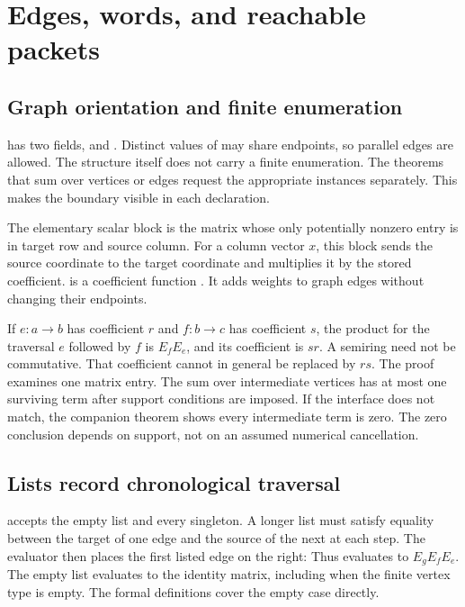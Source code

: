 \clearpage
\section{Edges, words, and reachable packets}
\subsection{Graph orientation and finite enumeration}
 has two fields,  and . Distinct values of  may share endpoints, so parallel edges are allowed. The structure itself does not carry a finite enumeration. The theorems that sum over vertices or edges request the appropriate  instances separately. This makes the boundary visible in each declaration.

The elementary scalar block is the matrix whose only potentially nonzero entry is in target row and source column.
For a column vector $x$, this block sends the source coordinate to the target coordinate and multiplies it by the stored coefficient.  is a coefficient function . It adds weights to graph edges without changing their endpoints.

If $e:a\to b$ has coefficient $r$ and $f:b\to c$ has coefficient $s$, the product for the traversal $e$ followed by $f$ is $E_fE_e$, and its coefficient is $sr$. A semiring need not be commutative. That coefficient cannot in general be replaced by $rs$.
The proof examines one matrix entry. The sum over intermediate vertices has at most one surviving term after support conditions are imposed. If the interface does not match, the companion theorem  shows every intermediate term is zero. The zero conclusion depends on support, not on an assumed numerical cancellation.

\subsection{Lists record chronological traversal}
 accepts the empty list and every singleton. A longer list must satisfy equality between the target of one edge and the source of the next at each step. The evaluator then places the first listed edge on the right:
Thus \code{[e,f,g]} evaluates to $E_gE_fE_e$. The empty list evaluates to the identity matrix, including when the finite vertex type is empty. The formal definitions cover the empty case directly.

